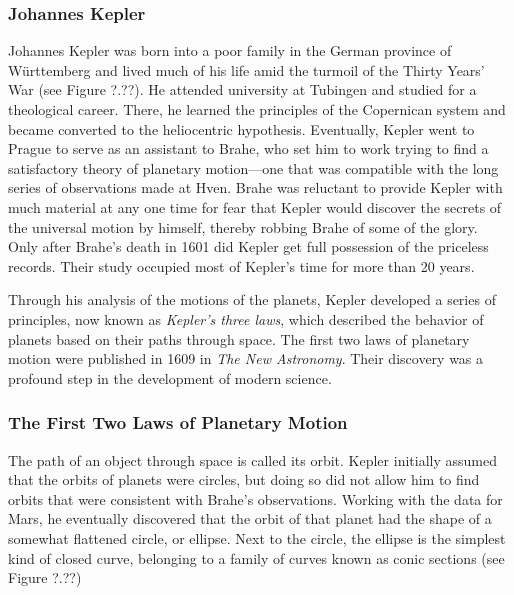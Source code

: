\documentclass[../../main-astronomy.tex]{subfiles}
\begin{document}
\vspace{1em}

\subsubsection*{Johannes Kepler}

Johannes Kepler was born into a poor family in the German province of W\"{u}rttemberg and lived much of his life amid the turmoil of the Thirty Years' War (see Figure ?.??). He attended university at Tubingen and studied for a theological career. There, he learned the principles of the Copernican system and became converted to the heliocentric hypothesis. Eventually, Kepler went to Prague to serve as an assistant to Brahe, who set him to work trying to find a satisfactory theory of planetary motion---one that was compatible with the long series of observations made at Hven. Brahe was reluctant to provide Kepler with much material at any one time for fear that Kepler would discover the secrets of the universal motion by himself, thereby robbing Brahe of some of the glory. Only after Brahe's death in 1601 did Kepler get full possession of the priceless records. Their study occupied most of Kepler's time for more than 20 years.

\vspace{1em}

Through his analysis of the motions of the planets, Kepler developed a series of principles, now known as \textit{Kepler's three laws}, which described the behavior of planets based on their paths through space. The first two laws of planetary motion were published in 1609 in \textit{The New Astronomy}. Their discovery was a profound step in the development of modern science.


\subsubsection{The First Two Laws of Planetary Motion}

The path of an object through space is called its orbit. Kepler initially assumed that the orbits of planets were circles, but doing so did not allow him to find orbits that were consistent with Brahe's observations. Working with the data for Mars, he eventually discovered that the orbit of that planet had the shape of a somewhat flattened circle, or ellipse. Next to the circle, the ellipse is the simplest kind of closed curve, belonging to a family of curves known as conic sections (see Figure ?.??)
\end{document}
